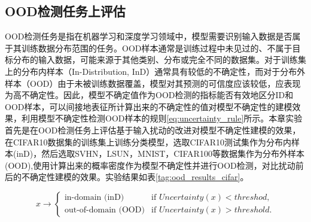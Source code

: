 \subsection{OOD检测任务上评估}
OOD检测任务是指在机器学习和深度学习领域中，模型需要识别输入数据是否属于其训练数据分布范围的任务。OOD样本通常是训练过程中未见过的、不属于目标分布的输入数据，可能来源于其他类别、分布或完全不同的数据集。对于训练集上的分布内样本（In-Distribution, InD）通常具有较低的不确定性，而对于分布外样本（OOD）由于未被训练数据覆盖，模型对其预测的可信度应该较低，应表现为高不确定性。因此，模型不确定值作为OOD检测的指标能否有效地区分ID和OOD样本，可以间接地表征所计算出来的不确定性的值对模型不确定性的建模效果，利用模型不确定性检测OOD样本的规则\ref{eq:uncertainty_rule}所示。本章实验首先是在OOD检测任务上评估基于输入扰动的改进对模型不确定性建模的效果，在CIFAR10数据集的训练集上训练分类模型，选取CIFAR10测试集作为分布内样本(inD)，然后选取SVHN，LSUN，MNIST，CIFAR100等数据集作为分布外样本(OOD),使用计算出来的概率密度作为模型不确定性并进行OOD检测，对比扰动前后的不确定性建模的效果。实验结果如表\ref{tag:ood_results_cifar}。

\begin{equation}
x {\rightarrow}
\begin{cases} 
\text{in-domain (inD)} & \text{if } Uncertainty(x) < threshod, \\
\text{out-of-domain (OOD)} & \text{if } Uncertainty(x) > threshold.
\end{cases}
\label{eq:uncertainty_rule}
\end{equation}



